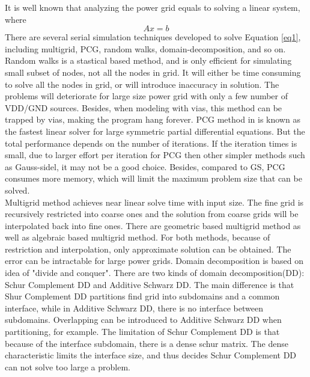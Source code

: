\documentclass{sig-alternate}
\begin{document}
	It is well known that analyzing the power grid equals to solving a linear system, where 
	\begin{equation}\label{eq1}
		Ax=b
	\end{equation}
	There are several serial simulation techniques developed to solve Equation \eqref{eq1}, including multigrid\cite{kozhaya}, 
	PCG\cite{Tsung-Hao}, random walks\cite{Boghrati}, domain-decomposition\cite{Quming}\cite{Zhongyu}, and so on. Random walks 
	is a stastical based method, and is only efficient for simulating small subset of nodes, not all the nodes in grid. 
	It will either be time consuming to solve all the nodes in grid, or will introduce inaccuracy in solution. The problems will
	deteriorate for large size power grid with only a few number of VDD/GND sources. Besides, when modeling with vias, this method
	can be trapped by vias, making the program hang forever. PCG method in\cite{Tsung-Hao} is known as the fastest linear solver 
	for large symmetric partial differential equations. But the total performance depends on the number of iterations. If the 
	iteration times is small, due to larger effort per iteration for PCG then other simpler methods such as Gauss-sidel, it may 
	not be a good choice. Besides, compared to GS, PCG consumes more memory, which will limit the maximum problem size that can be 
	solved.\\  	
	
	Multigrid method achieves near linear solve time with input size. The fine grid is recursively restricted into coarse ones 
	and the solution from coarse grids will be interpolated back into fine ones. There are geometric based multigrid method as well as 
	algebraic based multigrid method. For both methods, because of restriction and interpolation, only approximate solution can be 
	obtained. The error can be intractable for large power grids. Domain decomposition is based on idea of "divide and conquer". 
	There are two kinds of domain decomposition(DD): Schur Complement DD and Additive Schwarz DD. The main difference is that Shur 
	Complement DD partitions find grid into subdomains
	and a common interface, while in Additive Schwarz DD, there is no interface between subdomains. Overlapping can be introduced to
	Additive Schwarz DD when partitioning, for example\cite{Zhongyu}. The limitation of Schur Complement DD is that because of the 
	interface subdomain, there is a dense schur matrix. The dense characteristic limits the interface size, and thus decides Schur 
	Complement DD can not solve too large a problem.\\
\end{document}
